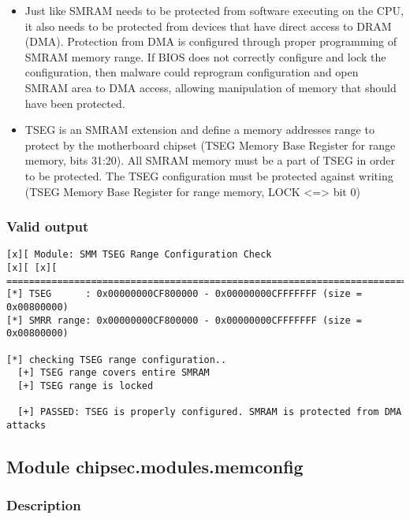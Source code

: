 \begin{itemize}
\tightlist
\item
  Just like SMRAM needs to be protected from software executing on the
  CPU, it also needs to be protected from devices that have direct
  access to DRAM (DMA). Protection from DMA is configured through proper
  programming of SMRAM memory range. If BIOS does not correctly
  configure and lock the configuration, then malware could reprogram
  configuration and open SMRAM area to DMA access, allowing manipulation
  of memory that should have been protected.
\item
  TSEG is an SMRAM extension and define a memory addresses range to
  protect by the motherboard chipset (TSEG Memory Base Register for
  range memory, bits 31:20). All SMRAM memory must be a part of TSEG in
  order to be protected. The TSEG configuration must be protected
  against writing (TSEG Memory Base Register for range memory, LOCK
  \textless=\textgreater{} bit 0)
\end{itemize}

\hypertarget{valid-output-11}{%
\subsubsection{Valid output}\label{valid-output-11}}

\begin{verbatim}
[x][ Module: SMM TSEG Range Configuration Check
[x][ [x][ =======================================================================
[*] TSEG      : 0x00000000CF800000 - 0x00000000CFFFFFFF (size = 0x00800000)
[*] SMRR range: 0x00000000CF800000 - 0x00000000CFFFFFFF (size = 0x00800000)

[*] checking TSEG range configuration..
  [+] TSEG range covers entire SMRAM
  [+] TSEG range is locked

  [+] PASSED: TSEG is properly configured. SMRAM is protected from DMA attacks
\end{verbatim}

\hypertarget{module-chipsec.modules.memconfig}{%
\subsection{Module
chipsec.modules.memconfig}\label{module-chipsec.modules.memconfig}}

\hypertarget{description-12}{%
\subsubsection{Description}\label{description-12}}

